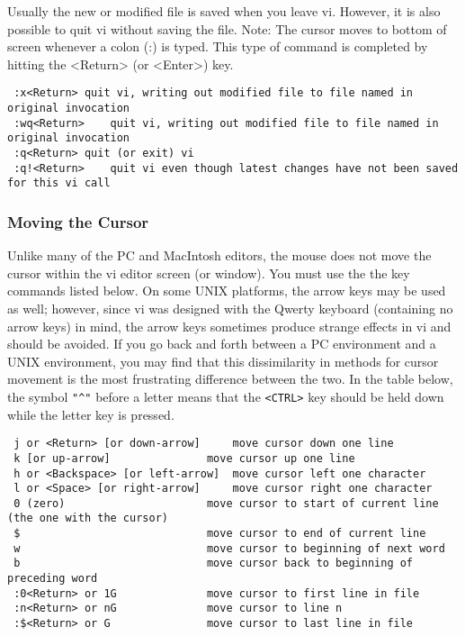 Usually the new or modified file is saved when you leave vi. However, it is also possible to quit vi without saving the file.
Note: The cursor moves to bottom of screen whenever a colon (:) is typed. This type of command is completed by hitting the <Return> (or <Enter>) key.

\begin{lstlisting}
 :x<Return>	quit vi, writing out modified file to file named in original invocation
 :wq<Return>	quit vi, writing out modified file to file named in original invocation
 :q<Return>	quit (or exit) vi
 :q!<Return>	quit vi even though latest changes have not been saved for this vi call
\end{lstlisting}


\subsubsection{Moving the Cursor}

Unlike many of the PC and MacIntosh editors, the mouse does not move the cursor within the vi editor screen (or window). You must use the the key commands listed below. On some UNIX platforms, the arrow keys may be used as well; however, since vi was designed with the Qwerty keyboard (containing no arrow keys) in mind, the arrow keys sometimes produce strange effects in vi and should be avoided.
If you go back and forth between a PC environment and a UNIX environment, you may find that this dissimilarity in methods for cursor movement is the most frustrating difference between the two.
In the table below, the symbol \verb|"^"| before a letter means that the \verb|<CTRL>| key should be held down while the letter key is pressed.

\begin{lstlisting}
 j or <Return> [or down-arrow]	   move cursor down one line
 k [or up-arrow]	           move cursor up one line
 h or <Backspace> [or left-arrow]  move cursor left one character
 l or <Space> [or right-arrow]	   move cursor right one character
 0 (zero)	                   move cursor to start of current line (the one with the cursor)
 $	                           move cursor to end of current line
 w	                           move cursor to beginning of next word
 b	                           move cursor back to beginning of preceding word
 :0<Return> or 1G	           move cursor to first line in file
 :n<Return> or nG	           move cursor to line n
 :$<Return> or G	           move cursor to last line in file
\end{lstlisting}


